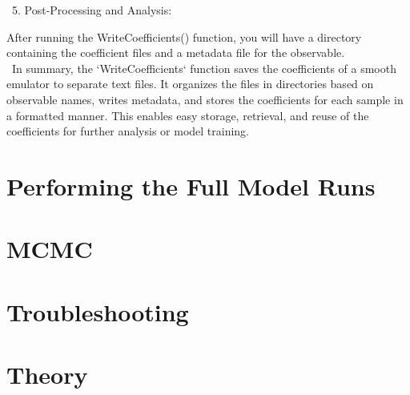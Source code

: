 \documentclass[12pt]{article}
\numberwithin{equation}{section}
\numberwithin{figure}{section}
\begin{document}
\ 5. Post-Processing and Analysis:

After running the WriteCoefficients() function, you will have a directory containing the coefficient files and a metadata file for the observable. \\

\ In summary, the `WriteCoefficients` function saves the coefficients of a smooth emulator to separate text files. It organizes the files in directories based on observable names, writes metadata, and stores the coefficients for each sample in a formatted manner. This enables easy storage, retrieval, and reuse of the coefficients for further analysis or model training. \\



\section{Performing the Full Model Runs}

\subsection{}

\section{MCMC}


\section{Troubleshooting}


\section{Theory}
\end{document}
